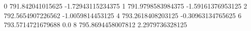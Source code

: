 0 791.842041015625 -1.72943115234375
1 791.9798583984375 -1.59161376953125
2 792.5654907226562 -1.0059814453125
4 793.2618408203125 -0.30963134765625
6 793.5714721679688 0.0
8 795.8694458007812 2.2979736328125
